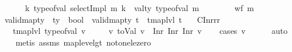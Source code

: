 \begin{isabellebody}
\ \ \ \ \ \ {\isacharparenleft}{\kern0pt}{\isasymforall}k{\isachardot}{\kern0pt}\ type{\isacharunderscore}{\kern0pt}of{\isacharunderscore}{\kern0pt}val\ {\isacharparenleft}{\kern0pt}selectImpl\ m\ k{\isacharparenright}{\kern0pt}\ {\isacharequal}{\kern0pt}\ val{\isacharunderscore}{\kern0pt}ty\ {\isacharparenleft}{\kern0pt}type{\isacharunderscore}{\kern0pt}of{\isacharunderscore}{\kern0pt}val\ m{\isacharparenright}{\kern0pt}{\isacharparenright}{\kern0pt}\isanewline
\ \ \ \ \ \ {\isasymrbrakk}\ {\isasymLongrightarrow}\ wf\ m{\isachardoublequoteclose}\isanewline
\isanewline
\isanewline
{}\isamarkupfalse%
\ valid{\isacharunderscore}{\kern0pt}mapty\ {\isacharcolon}{\kern0pt}{\isacharcolon}{\kern0pt}\ {\isachardoublequoteopen}ty\ {\isasymRightarrow}\ bool{\isachardoublequoteclose}\ \ {\isachardoublequoteopen}valid{\isacharunderscore}{\kern0pt}mapty\ t\ {\isacharequal}{\kern0pt}\ {\isacharparenleft}{\kern0pt}tmap{\isacharunderscore}{\kern0pt}lvl\ t\ {\isasymle}\ {}{\isacharparenright}{\kern0pt}{\isachardoublequoteclose}%
\isadelimdocument
%
\endisadelimdocument
%
\isatagdocument
%
\isamarkuptrue%
%
\endisatagdocument
{\isafolddocument}%
%
\isadelimdocument
%
\endisadelimdocument
{}\isamarkupfalse%
\ C{}Inrrr{\isacharcolon}{\kern0pt}\isanewline
\ \ \ {\isachardoublequoteopen}tmap{\isacharunderscore}{\kern0pt}lvl\ {\isacharparenleft}{\kern0pt}type{\isacharunderscore}{\kern0pt}of{\isacharunderscore}{\kern0pt}val\ v{\isacharparenright}{\kern0pt}\ {\isacharequal}{\kern0pt}\ {}{\isachardoublequoteclose}\isanewline
\ \ \ {\isachardoublequoteopen}{\isasymexists}v{\isacharprime}{\kern0pt}{\isachardot}{\kern0pt}\ toVal{}{}{}{}\ v\ {\isacharequal}{\kern0pt}\ Inr\ {\isacharparenleft}{\kern0pt}Inr\ {\isacharparenleft}{\kern0pt}Inr\ v{\isacharprime}{\kern0pt}{\isacharparenright}{\kern0pt}{\isacharparenright}{\kern0pt}{\isachardoublequoteclose}\isanewline
%
\isadelimproof
\ \ %
\endisadelimproof
%
\isatagproof
{}\isamarkupfalse%
\ {\isacharparenleft}{\kern0pt}cases\ v{\isacharparenright}{\kern0pt}\isanewline
\ \ \ \ \isamarkupfalse%
\ auto\isanewline
\ \ \isamarkupfalse%
\ {\isacharparenleft}{\kern0pt}metis\ assms\ map{\isacharunderscore}{\kern0pt}level{\isacharunderscore}{\kern0pt}gt{\isacharunderscore}{\kern0pt}{}\ not{\isacharunderscore}{\kern0pt}one{\isacharunderscore}{\kern0pt}le{\isacharunderscore}{\kern0pt}zero\isanewline

\end{isabellebody}
